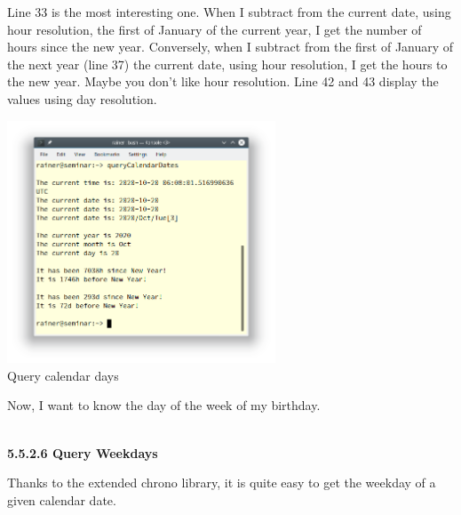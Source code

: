 Line 33 is the most interesting one. When I subtract from the current date, using hour resolution, the first of January of the current year, I get the number of hours since the new year. Conversely, when I subtract from the first of January of the next year (line 37) the current date, using hour resolution, I get the hours to the new year. Maybe you don’t like hour resolution. Line 42 and 43 display the values using day resolution.

\begin{center}
\includegraphics[width=0.6\textwidth]{content/3/chapter5/images/24.png}\\
Query calendar days
\end{center}

Now, I want to know the day of the week of my birthday.

\hspace*{\fill} \\ %
\noindent
\textbf{5.5.2.6\hspace{0.2cm} Query Weekdays}

Thanks to the extended chrono library, it is quite easy to get the weekday of a given calendar date.

